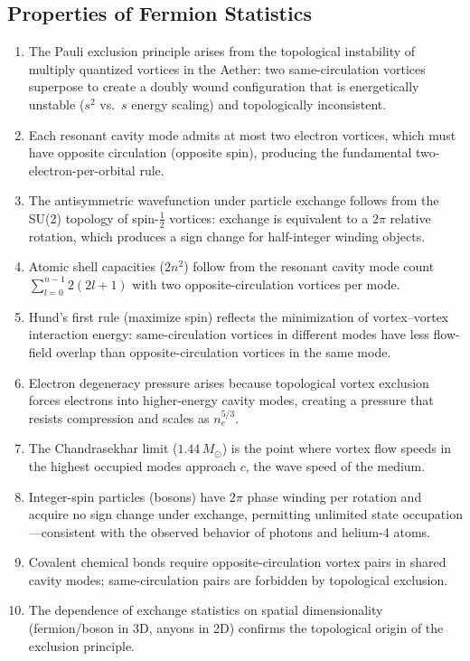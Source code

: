 ﻿\documentclass[12pt,letterpaper]{article}
\begin{document}
\subsection{Properties of Fermion Statistics}

\begin{enumerate}[leftmargin=2em]
  \item The Pauli exclusion principle arises from the topological instability of
    multiply quantized vortices in the Aether: two same-circulation vortices
    superpose to create a doubly wound configuration that is energetically unstable
    ($s^2$ vs.\ $s$ energy scaling) and topologically inconsistent.
  \item Each resonant cavity mode admits at most two electron vortices, which must
    have opposite circulation (opposite spin), producing the fundamental
    two-electron-per-orbital rule.
  \item The antisymmetric wavefunction under particle exchange follows from the
    SU(2) topology of spin-$\tfrac{1}{2}$ vortices: exchange is equivalent to a
    $2\pi$ relative rotation, which produces a sign change for half-integer
    winding objects.
  \item Atomic shell capacities ($2n^2$) follow from the resonant cavity mode
    count $\sum_{l=0}^{n-1} 2(2l+1)$ with two opposite-circulation vortices per mode.
  \item Hund's first rule (maximize spin) reflects the minimization of
    vortex--vortex interaction energy: same-circulation vortices in different modes
    have less flow-field overlap than opposite-circulation vortices in the same mode.
  \item Electron degeneracy pressure arises because topological vortex exclusion
    forces electrons into higher-energy cavity modes, creating a pressure that
    resists compression and scales as $n_e^{5/3}$.
  \item The Chandrasekhar limit ($1.44\,M_\odot$) is the point where vortex flow
    speeds in the highest occupied modes approach $c$, the wave speed of the medium.
  \item Integer-spin particles (bosons) have $2\pi$ phase winding per rotation and
    acquire no sign change under exchange, permitting unlimited state occupation---consistent
    with the observed behavior of photons and helium-4 atoms.
  \item Covalent chemical bonds require opposite-circulation vortex pairs in shared
    cavity modes; same-circulation pairs are forbidden by topological exclusion.
  \item The dependence of exchange statistics on spatial dimensionality (fermion/boson
    in 3D, anyons in 2D) confirms the topological origin of the exclusion principle.
\end{enumerate}
\end{document}
